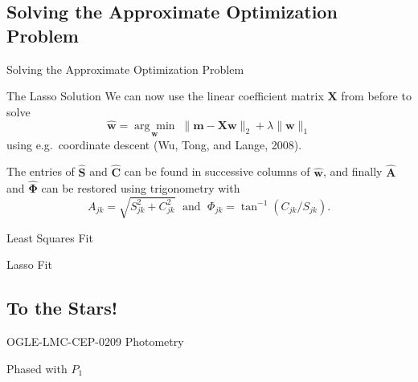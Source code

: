 \documentclass{beamer}
\begin{document}
\subsection{Solving the Approximate Optimization Problem}
\begin{frame}{Solving the Approximate Optimization Problem}
\begin{block}{The Lasso Solution}
We can now use the linear coefficient matrix $\mathbf X$ from before to solve
$$\mathbf{\hat w} = \underset{\mathbf w}{\arg\min} \; \| \mathbf {m} - \mathbf {X} \mathbf {w} \|_2 + \lambda \| \mathbf{w} \|_1$$
using e.g.~coordinate descent (Wu, Tong, and Lange, 2008).
\end{block}
\vspace{5mm}
The entries of $\mathbf{\hat S}$ and $\mathbf{\hat C}$ can be found in successive columns of $\mathbf{\hat{w}}$, and finally $\mathbf{\hat A}$ and $\boldsymbol{\hat{\Phi}}$ can be restored using trigonometry with
$$A_{jk} = \sqrt{S_{jk}^2 + C_{jk}^2} \; \text{ and } \; \Phi_{jk} = \tan^{-1} (C_{jk} / S_{jk}).$$
\end{frame}

\begin{frame}{Least Squares Fit}
\begin{figure}
\centering

\end{figure} 
\end{frame}

\begin{frame}{Lasso Fit}
\begin{figure}
\centering

\end{figure} 
\end{frame}

\subsection{To the Stars!}
\begin{frame}{OGLE-LMC-CEP-0209 Photometry}
\begin{figure}

\end{figure} 
\end{frame}

\begin{frame}{Phased with $P_1$}
\begin{figure}

\end{figure} 
\end{frame}
\end{document}
